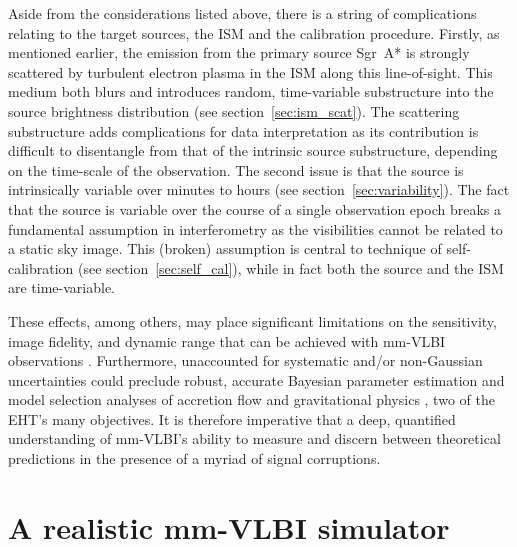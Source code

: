 Aside from the considerations listed above, there is a string of complications relating to the target sources, the ISM and the calibration procedure. 
Firstly, as mentioned earlier, the emission from the primary source Sgr~A* is strongly scattered by turbulent electron plasma in the ISM along this line-of-sight. This medium both blurs and introduces random, time-variable substructure into the source brightness distribution (see section~\ref{sec:ism_scat}). The scattering substructure adds complications for data interpretation as its contribution is difficult to disentangle from that of the intrinsic source substructure, depending on the time-scale of the observation.
The second issue is that the source is intrinsically variable over minutes to hours (see section~\ref{sec:variability}). The fact that the source is variable over the course of a single observation epoch breaks a fundamental assumption in interferometry as the visibilities cannot be related to a static sky image.
This (broken) assumption is central to technique of self-calibration (see section~\ref{sec:self_cal}), while in fact both the source and the ISM are time-variable.


These effects, among others, may place significant limitations on the sensitivity, image fidelity, and dynamic range that can be achieved with mm-VLBI observations \citep{Blecher_2016}.  Furthermore, unaccounted for systematic and/or non-Gaussian uncertainties could preclude robust, accurate Bayesian parameter estimation and model selection analyses of accretion flow \citep[e.g.][]{Broderick_2016} and gravitational physics \citep[e.g.][]{Broderick_2014, Psaltis_2016}, two of the EHT's many objectives. It is therefore imperative that a deep, quantified understanding of mm-VLBI's ability to measure and discern between theoretical predictions in the presence of a myriad of signal corruptions.


\section{A realistic mm-VLBI simulator}

